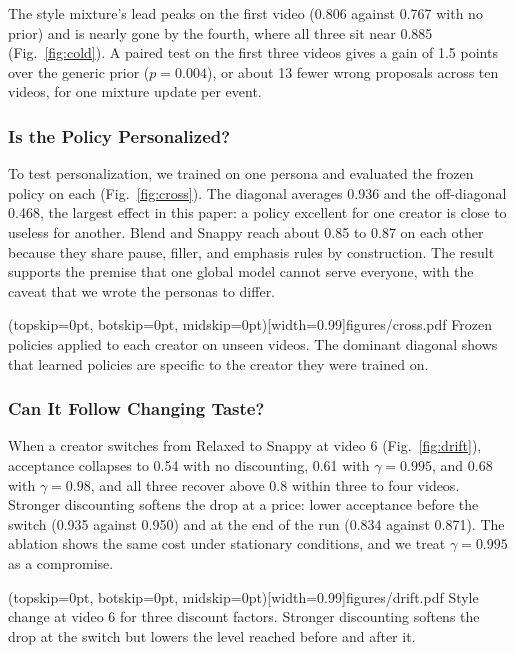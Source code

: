 \documentclass{ieeeaccess}
\begin{document}
The style mixture's lead peaks on the first video (0.806 against 0.767 with no prior) and is nearly gone by the fourth, where all three sit near 0.885 (Fig.~\ref{fig:cold}). A paired test on the first three videos gives a gain of 1.5 points over the generic prior ($p=0.004$), or about 13 fewer wrong proposals across ten videos, for one mixture update per event.

\subsubsection{Is the Policy Personalized?}
To test personalization, we trained on one persona and evaluated the frozen policy on each (Fig.~\ref{fig:cross}). The diagonal averages 0.936 and the off-diagonal 0.468, the largest effect in this paper: a policy excellent for one creator is close to useless for another. Blend and Snappy reach about 0.85 to 0.87 on each other because they share pause, filler, and emphasis rules by construction. The result supports the premise that one global model cannot serve everyone, with the caveat that we wrote the personas to differ.

\Figure[t!](topskip=0pt, botskip=0pt, midskip=0pt)[width=0.99\columnwidth]{figures/cross.pdf}
{Frozen policies applied to each creator on unseen videos. The dominant diagonal shows that learned policies are specific to the creator they were trained on.\label{fig:cross}}

\subsubsection{Can It Follow Changing Taste?}
When a creator switches from Relaxed to Snappy at video 6 (Fig.~\ref{fig:drift}), acceptance collapses to 0.54 with no discounting, 0.61 with $\gamma=0.995$, and 0.68 with $\gamma=0.98$, and all three recover above 0.8 within three to four videos. Stronger discounting softens the drop at a price: lower acceptance before the switch (0.935 against 0.950) and at the end of the run (0.834 against 0.871). The ablation shows the same cost under stationary conditions, and we treat $\gamma=0.995$ as a compromise.

\Figure[t!](topskip=0pt, botskip=0pt, midskip=0pt)[width=0.99\columnwidth]{figures/drift.pdf}
{Style change at video 6 for three discount factors. Stronger discounting softens the drop at the switch but lowers the level reached before and after it.\label{fig:drift}}
\end{document}
